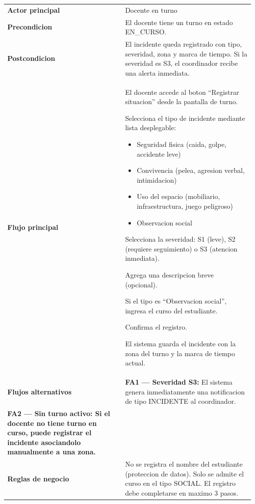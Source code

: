 \documentclass[12pt, a4paper]{article}
\newcommand{\cu}[3]{%
  \begin{tcolorbox}[casousostyle, title={#1},
    after title={\hfill\small\normalfont\color{white!80!azulOscuro}#2}]
  \renewcommand{\arraystretch}{1.35}
  \begin{tabularx}{\linewidth}{>{\bfseries\color{azulOscuro}\small}p{3.6cm} X}
  #3
  \end{tabularx}
  \end{tcolorbox}
  \vspace{6pt}
}
\newcommand{\fcu}[2]{\small\textbf{\color{azulOscuro}#1} & \small #2 \\}
\begin{document}
\cu{CU-07 --- Registrar incidente}{Docente}{
  \fcu{Actor principal}{Docente en turno}
  \fcu{Precondicion}{El docente tiene un turno en estado EN\_CURSO.}
  \fcu{Postcondicion}{El incidente queda registrado con tipo, severidad, zona y marca de tiempo. Si la severidad es S3, el coordinador recibe una alerta inmediata.}
  \fcu{Flujo principal}{
    \begin{pasos}
      \item El docente accede al boton ``Registrar situacion'' desde la pantalla de turno.
      \item Selecciona el tipo de incidente mediante lista desplegable:
        \begin{itemize}[itemsep=1pt, topsep=2pt]
          \item Seguridad fisica (caida, golpe, accidente leve)
          \item Convivencia (pelea, agresion verbal, intimidacion)
          \item Uso del espacio (mobiliario, infraestructura, juego peligroso)
          \item Observacion social
        \end{itemize}
      \item Selecciona la severidad: S1 (leve), S2 (requiere seguimiento) o S3 (atencion inmediata).
      \item Agrega una descripcion breve (opcional).
      \item Si el tipo es ``Observacion social'', ingresa el curso del estudiante.
      \item Confirma el registro.
      \item El sistema guarda el incidente con la zona del turno y la marca de tiempo actual.
    \end{pasos}
  }
  \fcu{Flujos alternativos}{
    \textbf{FA1 --- Severidad S3:} El sistema genera inmediatamente una notificacion de tipo INCIDENTE al coordinador.\\[4pt]
    \textbf{FA2 --- Sin turno activo:} Si el docente no tiene turno en curso, puede registrar el incidente asociandolo manualmente a una zona.
  }
  \fcu{Reglas de negocio}{No se registra el nombre del estudiante (proteccion de datos). Solo se admite el curso en el tipo SOCIAL. El registro debe completarse en maximo 3 pasos.}
}
\end{document}
